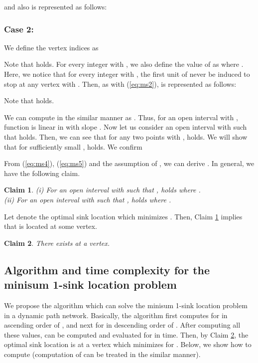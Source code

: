 \documentclass[a4paper]{llncs}
\newtheorem{clm}{Claim}
\begin{document}
and also  is represented as follows:


\subsubsection{Case 2:}
We define the vertex indices  as

Note that  holds. 
For every integer  with , we also define the value of  as  where .
Here, we notice that for every integer  with , the first unit of  never be induced to stop at any vertex  with .
Then, as with (\ref{eq:ms2}),  is represented as follows:

Note that  holds.



\vspace{4mm}

We can compute  in the similar manner as .
Thus, for an open interval  with , function  is linear in  with slope .
Now let us consider an open interval  with  such that  holds.
Then, we can see that for any two points  with ,  holds.
We will show that for sufficiently small ,  holds.
We confirm

From (\ref{eq:ms4}), (\ref{eq:ms5}) and the assumption of , 
we can derive .
In general, we have the following claim.
\begin{clm}
{\rm (i)} For an open interval  with  such that ,
 holds where . \\
{\rm (ii)} For an open interval  with  such that ,
 holds where . 
\label{clm:ms1}
\end{clm}
Let  denote the optimal sink location which minimizes .
Then, Claim \ref{clm:ms1} implies that  is located at some vertex.
\begin{clm}
There exists  at a vertex.
\label{clm:ms2}
\end{clm}


\subsection{Algorithm and time complexity for the minisum 1-sink location problem}
We propose the algorithm which can solve the minisum 1-sink location problem in a dynamic path network.
Basically, the algorithm first computes  for  in ascending order of , and next  for  in descending order of .
After computing all these values,  can be computed and evaluated for  in  time.
Then, by Claim \ref{clm:ms2}, the optimal sink location  is at a vertex which minimizes  for .
Below, we show how to compute  (computation of  can be treated in the similar manner).
\end{document}
